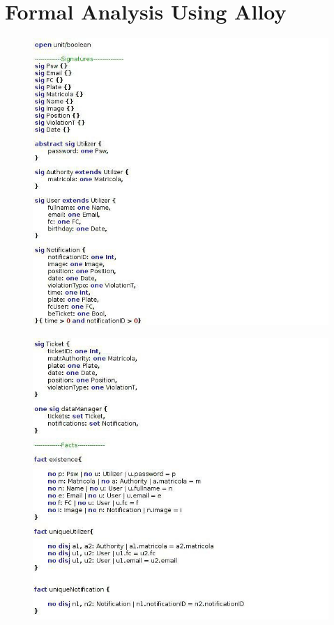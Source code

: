 \documentclass {article}
\begin{document}
\section{Formal Analysis Using Alloy}
\begin{figure}[H]
			\centering
			\includegraphics[scale=0.75]{Images/Alloy/alloy_1.jpg}
		\end{figure}
\begin{figure}[H]
			\centering
			\includegraphics[scale=0.75]{Images/Alloy/alloy_2.jpg}
		\end{figure}
\end{document}
